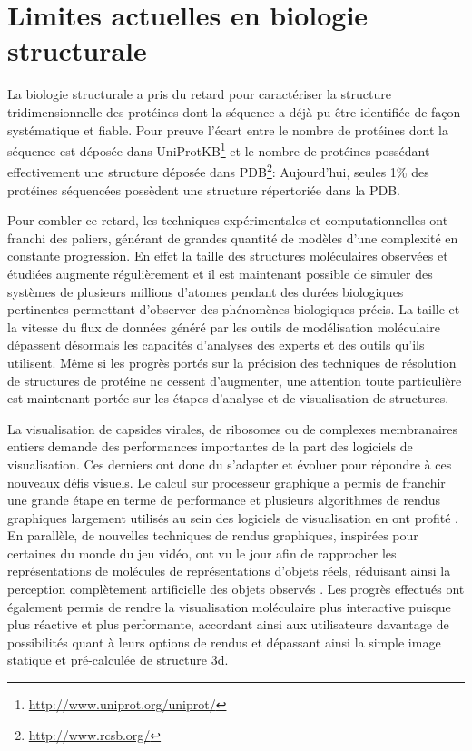 \section{Limites actuelles en biologie structurale}

La biologie structurale a pris du retard pour caractériser la structure tridimensionnelle des protéines dont la séquence a déjà pu être identifiée de façon systématique et fiable. Pour preuve l'écart entre le nombre de protéines dont la séquence est déposée dans UniProtKB\footnote{\url{http://www.uniprot.org/uniprot/}} et le nombre de protéines possédant effectivement une structure déposée dans PDB\footnote{\url{http://www.rcsb.org/}}: Aujourd'hui, seules 1\% des protéines séquencées possèdent une structure répertoriée dans la PDB. 

Pour combler ce retard, les techniques expérimentales et computationnelles ont franchi des paliers, générant de grandes quantité de modèles d'une complexité en constante progression. En effet la taille des structures moléculaires observées et étudiées augmente régulièrement et il est maintenant possible de simuler des systèmes de plusieurs millions d'atomes pendant des durées biologiques pertinentes permettant d'observer des phénomènes biologiques précis. La taille et la vitesse du flux de données généré par les outils de modélisation moléculaire dépassent désormais les capacités d'analyses des experts et des outils qu'ils utilisent. Même si les progrès portés sur la précision des techniques de résolution de structures de protéine ne cessent d'augmenter, une attention toute particulière est maintenant portée sur les étapes d'analyse et de visualisation de structures.

La visualisation de capsides virales, de ribosomes ou de complexes membranaires entiers demande des performances importantes de la part des logiciels de visualisation. Ces derniers ont donc du s'adapter et évoluer pour répondre à ces nouveaux défis visuels. Le calcul sur processeur graphique a permis de franchir une grande étape en terme de performance et plusieurs algorithmes de rendus graphiques largement utilisés au sein des logiciels de visualisation en ont profité \cite{chavent_gpu-powered_2011}. En parallèle, de nouvelles techniques de rendus graphiques, inspirées pour certaines du monde du jeu vidéo, ont vu le jour afin de rapprocher les représentations de molécules de représentations d'objets réels, réduisant ainsi la perception complètement artificielle des objets observés \cite{lv_game_2013}. Les progrès effectués ont également permis de rendre la visualisation moléculaire plus interactive puisque plus réactive et plus performante, accordant ainsi aux utilisateurs davantage de possibilités quant à leurs options de rendus et dépassant ainsi la simple image statique et pré-calculée de structure 3d.


